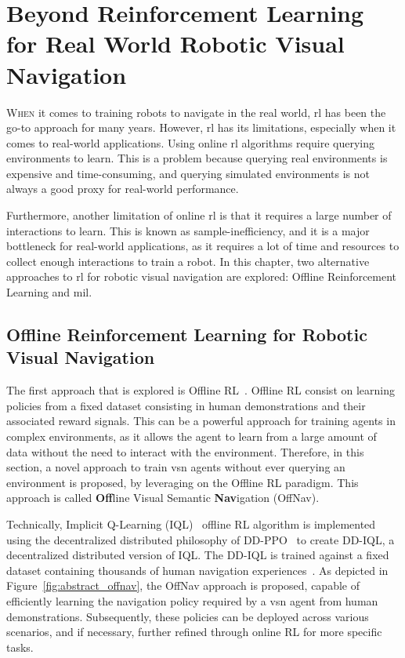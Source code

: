 \chapter[Beyond RL for Real World Robotic Navigation]{Beyond Reinforcement Learning for Real World Robotic Visual Navigation}\label{ch:beyond-rl}

\lettrine{\textcolor{accent_color}{W}}{hen} it comes to training robots to navigate in the real world, \acrshort{rl} has been the go-to approach for many years.
However, \acrshort{rl} has its limitations, especially when it comes to real-world applications.
Using online \acrshort{rl} algorithms require querying environments to learn.
This is a problem because querying real environments is expensive and time-consuming, and querying simulated environments is not always a good proxy for real-world performance.

Furthermore, another limitation of online \acrshort{rl} is that it requires a large number of interactions to learn.
This is known as sample-inefficiency, and it is a major bottleneck for real-world applications, as it requires a lot of time and resources to collect enough interactions to train a robot.
In this chapter, two alternative approaches to \acrshort{rl} for robotic visual navigation are explored: Offline Reinforcement Learning and \acrfull{mil}.


\section{Offline Reinforcement Learning for Robotic Visual Navigation}\label{sec:offline_rl4rvsn}

The first approach that is explored is Offline RL~\cite{levine2020}.
Offline RL consist on learning policies from a fixed dataset consisting in human demonstrations and their associated reward signals.
This can be a powerful approach for training agents in complex environments, as it allows the agent to learn from a large amount of data without the need to interact with the environment.
Therefore, in this section, a novel approach to train \acrshort{vsn} agents without ever querying an environment is proposed, by leveraging on the Offline RL paradigm.
This approach is called \textbf{Off}line Visual Semantic \textbf{Nav}igation (OffNav).

Technically, Implicit Q-Learning (IQL)~\cite{kostrikov2022offline} offline RL algorithm is implemented using the decentralized distributed philosophy of DD-PPO~\cite{wijmans2020} to create DD-IQL, a decentralized distributed version of IQL\@.
The DD-IQL is trained against a fixed dataset containing thousands of human navigation experiences~\cite{ramrakhya2023}.
As depicted in Figure~\ref{fig:abstract_offnav}, the OffNav approach is proposed, capable of efficiently learning the navigation policy required by a \acrshort{vsn} agent from human demonstrations.
Subsequently, these policies can be deployed across various scenarios, and if necessary, further refined through online RL for more specific tasks.

